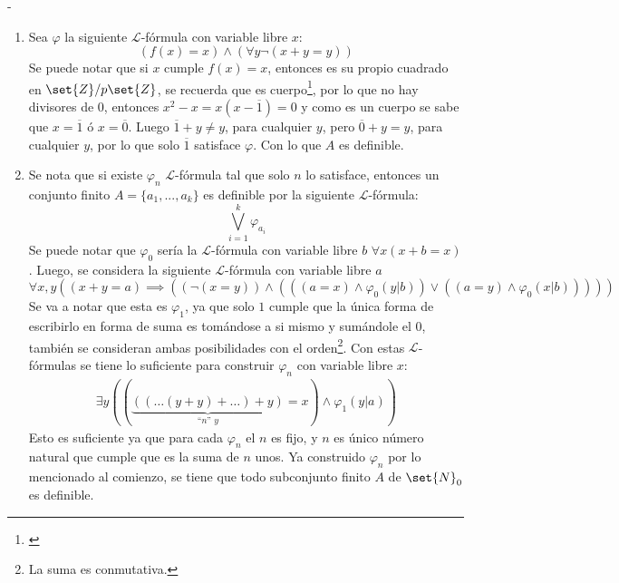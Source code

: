 \begin{sol}
    -\begin{enumerate}[label=(\alph*)]
        \item Sea \(\varphi\) la siguiente \(\mathcal{L}\)-fórmula con variable libre \(x\):
              \[(f(x)=x)\wedge(\forall y\neg(x+y=y))\]
              Se puede notar que si \(x\) cumple \(f(x)=x\), entonces es su propio cuadrado en \(\set{Z}/p\set{Z}\), se recuerda que es cuerpo\footnote{\cite{artin2011algebra}}, por lo que no hay divisores de \(0\), entonces \(x^2-x=x(x-\overline{1})=0\) y como es un cuerpo se sabe que \(x=\overline{1}\) ó \(x=\overline{0}\). Luego \(\overline{1}+y\neq y\), para cualquier \(y\), pero \(\overline{0}+y=y\), para cualquier \(y\), por lo que solo \(\overline{1}\) satisface \(\varphi\). Con lo que \(A\) es definible.
        \item Se nota que si existe \(\varphi_n\) \(\mathcal{L}\)-fórmula tal que solo \(n\) lo satisface, entonces un conjunto finito \(A=\{a_1,...,a_k\}\) es definible por la siguiente \(\mathcal{L}\)-fórmula:
              \[
                  \bigvee_{i=1}^k\varphi_{a_i}
              \]
              Se puede notar que \(\varphi_0\) sería la \(\mathcal{L}\)-fórmula  con variable libre \(b\) \(\forall x (x+b=x)\). Luego, se considera la siguiente \(\mathcal{L}\)-fórmula con variable libre \(a\)
              \[
                  \forall x,y ((x+y=a)\implies((\neg(x=y))\wedge(((a=x)\wedge\varphi_0(y|b))\vee((a=y)\wedge\varphi_0(x|b)))))
              \]
              Se va a notar que esta es \(\varphi_1\), ya que solo \(1\) cumple que la única forma de escribirlo en forma de suma es tomándose a si mismo y sumándole el \(0\), también se consideran ambas posibilidades con el orden\footnote{La suma es conmutativa.}. %
              Con estas \(\mathcal{L}\)-fórmulas se tiene lo suficiente para construir \(\varphi_n\) con variable libre \(x\):
              \begin{align*}
                  \exists y ((\underbrace{((\dots(y+y)+\dots)+y)}_{\text{``\(n\)'' \(y\)}}=x)\wedge \varphi_1(y|a))
              \end{align*}
              Esto es suficiente ya que para cada \(\varphi_n\) el \(n\) es fijo, y \(n\) es único número natural que cumple que es la suma de \(n\) unos. Ya construido \(\varphi_n\) por lo mencionado al comienzo, se tiene que todo subconjunto finito \(A\) de \(\set{N}_0\) es definible.
    \end{enumerate}
\end{sol}

